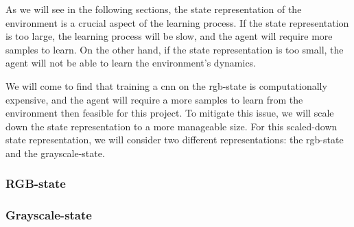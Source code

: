 As we will see in the following sections, the state representation of the
environment is a crucial aspect of the learning process. If the state
representation is too large, the learning process will be slow, and the agent
will require more samples to learn. On the other hand, if the state
representation is too small, the agent will not be able to learn the
environment's dynamics.

We will come to find that training a \gls{cnn} on the \gls{rgb}-state is
computationally expensive, and the agent will require a more samples to learn
from the environment then feasible for this project. To mitigate this issue, we
will scale down the state representation to a more manageable size. For this
scaled-down state representation, we will consider two different
representations: the \gls{rgb}-state and the grayscale-state.

\subsubsection{RGB-state}\label{sec:environment-state-representation-scaling-rgb-state}


\subsubsection{Grayscale-state}\label{sec:environment-state-representation-scaling-grayscale-state}
